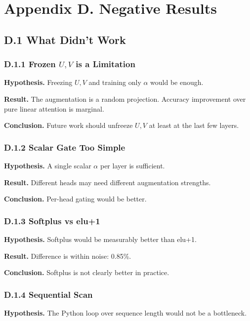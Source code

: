 
\section{Appendix D. Negative Results}

\subsection{D.1 What Didn't Work}

\subsubsection{D.1.1 Frozen $U, V$ is a Limitation}

\textbf{Hypothesis.} Freezing $U, V$ and training only $\alpha$ would be enough.

\textbf{Result.} The augmentation is a random projection. Accuracy improvement 
over pure linear attention is marginal.

\textbf{Conclusion.} Future work should unfreeze $U, V$ at least at the 
last few layers.

\subsubsection{D.1.2 Scalar Gate Too Simple}

\textbf{Hypothesis.} A single scalar $\alpha$ per layer is sufficient.

\textbf{Result.} Different heads may need different augmentation strengths.

\textbf{Conclusion.} Per-head gating would be better.

\subsubsection{D.1.3 Softplus vs elu+1}

\textbf{Hypothesis.} Softplus would be measurably better than elu+1.

\textbf{Result.} Difference is within noise: 0.85\%.

\textbf{Conclusion.} Softplus is not clearly better in practice.

\subsubsection{D.1.4 Sequential Scan}

\textbf{Hypothesis.} The Python loop over sequence length would not be a 
bottleneck.

